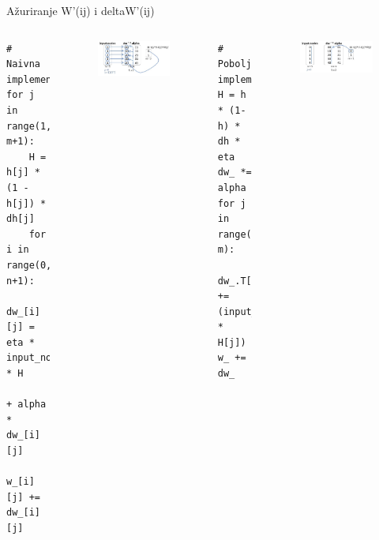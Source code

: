 \documentclass{beamer}
\begin{document}
\begin{frame}[fragile]{Ažuriranje W'(ij) i deltaW'(ij)}
\begin{columns}
    \begin{Verbatim}[fontsize=\tiny]
# Naivna implementacija
for j in range(1, m+1):
    H = h[j] * (1 - h[j]) * dh[j]
    for i in range(0, n+1):
        dw_[i][j] = eta * input_nodes[i] * H 
                    + alpha * dw_[i][j]
        w_[i][j] += dw_[i][j]
    \end{Verbatim}
    \begin{figure}
        \centering
        \includegraphics[scale=0.52]{azuriranje_w_.JPG}
    \end{figure}
    
    \begin{Verbatim}[fontsize=\tiny]
# Poboljsana implementacija
H = h * (1-h) * dh * eta
dw_ *= alpha
for j in range(0, m):
    dw_.T[j] += (input_nodes * H[j])
w_ += dw_
    \end{Verbatim}
    \begin{figure}
        \centering
        \includegraphics[scale=0.52]{poboljsano_azuriranje_w_.JPG}
    \end{figure}
\end{columns}
\end{frame}
\end{document}
